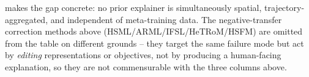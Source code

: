  makes the gap concrete: no prior explainer is simultaneously spatial, trajectory-aggregated, and independent of meta-training data. The negative-transfer correction methods above (HSML/ARML/IFSL/HeTRoM/HSFM) are omitted from the table on different grounds -- they target the same failure mode but act by \emph{editing} representations or objectives, not by producing a human-facing explanation, so they are not commensurable with the three columns above.

